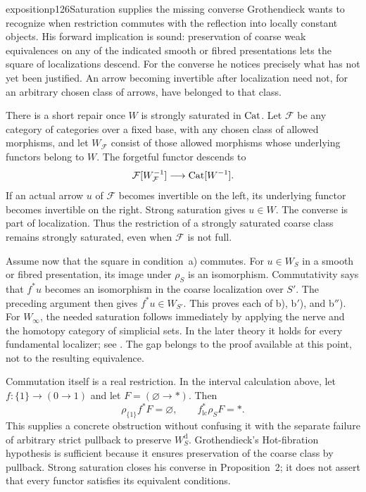 \begin{dcomment}{exposition}{p126}{Saturation supplies the missing converse}
Grothendieck wants to recognize when restriction commutes with the reflection into locally constant objects. His forward implication is sound: preservation of coarse weak equivalences on any of the indicated smooth or fibred presentations lets the square of localizations descend. For the converse he notices precisely what has not yet been justified. An arrow becoming invertible after localization need not, for an arbitrary chosen class of arrows, have belonged to that class.

There is a short repair once $W$ is strongly saturated in $\mathrm{Cat}$. Let $\mathcal F$ be any category of categories over a fixed base, with any chosen class of allowed morphisms, and let $W_{\mathcal F}$ consist of those allowed morphisms whose underlying functors belong to $W$. The forgetful functor descends to
\[
 \mathcal F[W_{\mathcal F}^{-1}]\longrightarrow\mathrm{Cat}[W^{-1}].
\]
If an actual arrow $u$ of $\mathcal F$ becomes invertible on the left, its underlying functor becomes invertible on the right. Strong saturation gives $u\in W$. The converse is part of localization. Thus the restriction of a strongly saturated coarse class remains strongly saturated, even when $\mathcal F$ is not full.

Assume now that the square in condition~a) commutes. For $u\in W_S$ in a smooth or fibred presentation, its image under $\rho_S$ is an isomorphism. Commutativity says that $f^*u$ becomes an isomorphism in the coarse localization over $S'$. The preceding argument then gives $f^*u\in W_{S'}$. This proves each of b), b$'$), and b$''$). For $W_\infty$, the needed saturation follows immediately by applying the nerve and the homotopy category of simplicial sets. In the later theory it holds for every fundamental localizer; see \citet[Proposition~4.2.4 in the author PDF]{Cisinski2006Presheaves}. The gap belongs to the proof available at this point, not to the resulting equivalence.

Commutation itself is a real restriction. In the interval calculation above, let $f:\{1\}\to(0\to1)$ and let $F=(\varnothing\to*)$. Then
\[
\rho_{\{1\}}f^*F=\varnothing,
 \qquad f^*_{\mathrm{lc}}\rho_S F=*.
\]
This supplies a concrete obstruction without confusing it with the separate failure of arbitrary strict pullback to preserve $W_S^{\mathrm d}$. Grothendieck's Hot-fibration hypothesis is sufficient because it ensures preservation of the coarse class by pullback. Strong saturation closes his converse in Proposition~2; it does not assert that every functor satisfies its equivalent conditions.
\end{dcomment}


